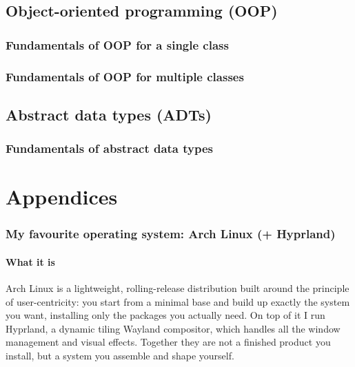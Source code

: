 \subsection{Object-oriented programming (OOP)}
\subsubsection{Fundamentals of OOP for a single class}
\subsubsection{Fundamentals of OOP for multiple classes}
\subsection{Abstract data types (ADTs)}
\subsubsection{Fundamentals of abstract data types}
\newpage
\section{Appendices}
\subsubsection{My favourite operating system: Arch Linux (+ Hyprland)}
\paragraph{What it is}
Arch Linux is a lightweight, rolling-release distribution built around the principle of user-centricity: you start from a minimal base and build up exactly the system you want, installing only the packages you actually need. On top of it I run Hyprland, a dynamic tiling Wayland compositor, which handles all the window management and visual effects. Together they are not a finished product you install, but a system you assemble and shape yourself.
